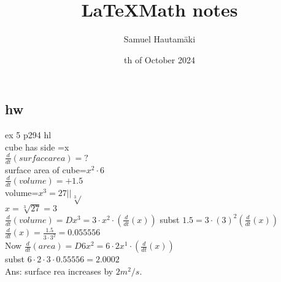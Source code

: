\documentclass{article}
\title{\LaTeX Math notes}
\author{Samuel Hautamäki}
\date{th of October 2024}
\begin{document}
  \maketitle
   
  \subsection{hw}
  ex 5 p294 hl\\
  cube has side =x\\
  $\frac{d}{dt}(surface area)=?$\\
  surface area of cube=$x^2\cdot6$\\
  $\frac{d}{dt}(volume)=+1.5$\\
  volume=$x^3=27 ||\sqrt[3]{}$\\
  $x=\sqrt[3]{27}=3$\\
  $\frac{d}{dt}(volume)=D x^3=3\cdot x^2\cdot(\frac{d}{dt}(x))$
  subst $1.5=3\cdot(3)^2(\frac{d}{dt}(x))$\\
  $\frac{d}{dt}(x)=\frac{1.5}{3\cdot3^2}=0.055556$\\
  Now $\frac{d}{dt}(area)=D 6x^2=6\cdot2x^1\cdot(\frac{d}{dt}(x))$\\
  subst $6\cdot2\cdot3\cdot0.55556=2.0002$\\
  Ans: surface rea increases by $2 m^2/s$.\\
\end{document}
